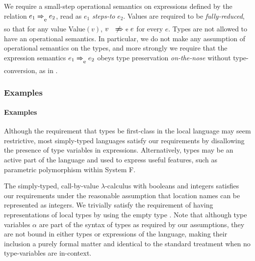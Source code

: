 We require a small-step operational semantics on expressions defined by the relation $e_1 \localstep{} e_2$, read as $e_1$ \emph{steps-to} $e_2$.
Values are required to be \emph{fully-reduced}, so that for any value Value$(v)$, $v \nlocalstep{} e$ for every $e$.
Types are not allowed to have an operational semantics.
In particular, we do not make any assumption of operational semantics on the types, and more strongly we require that the expression semantics $e_1 \localstep{} e_2$ obeys type preservation \emph{on-the-nose} without type-conversion, as in \todo.

\iftr\subsubsection{Examples}\else\paragraph{Examples}\fi
\label{sec:loc-lang-examples}

Although the requirement that types be first-class in the local language may seem restrictive, most simply-typed languages satisfy our requirements by disallowing the presence of type variables in expressions.
Alternatively, types may be an active part of the language and used to express useful features, such as parametric polymorphism within System F.

\begin{ex}
  \label{ex:st-lambda}
  The simply-typed, call-by-value $\lambda$-calculus with booleans and integers satisfies our requirements under the reasonable assumption that location names can be represented as integers.
  We trivially satisfy the requirement of having representations of local types by using the empty type \Empty.
  Note that although type variables $\alpha$ are part of the syntax of types as required by our assumptions, they are not bound in either types or expressions of the language, making their inclusion a purely formal matter and identical to the standard treatment when no type-variables are in-context.
  \begin{syntax}
  	 \alternative{\alpha} \alternative{\Int} \alternative{\Bool} \alternative{\Empty} 
       \\
     \\
    \alternative{\True} \alternative{\False} 
  \end{syntax}
\end{ex}

